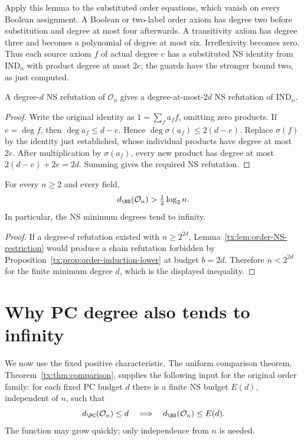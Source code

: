 Apply this lemma to the substituted order equations, which vanish on
every Boolean assignment. A Boolean or two-label order axiom has
degree two before substitution and degree at most four afterwards.
A transitivity axiom has degree three and becomes a polynomial of
degree at most six. Irreflexivity becomes zero. Thus each source
axiom $f$ of actual degree $e$ has a substituted NS identity from
$\mathrm{IND}_n$ with product degree at most $2e$; the guards have
the stronger bound two, as just computed.

\begin{lemma}
\label{tx:lem:order-NS-restriction}
A degree-$d$ NS refutation of $\mathcal O_n$ gives a degree-at-most-$2d$
NS refutation of $\mathrm{IND}_n$.
\end{lemma}
\begin{proof}
Write the original identity as $1=\sum_f a_ff$, omitting zero
products. If $e=\deg f$, then $\deg a_f\le d-e$. Hence
$\deg\sigma(a_f)\le2(d-e)$. Replace $\sigma(f)$ by the identity
just established, whose individual products have degree at most $2e$.
After multiplication by $\sigma(a_f)$, every new product has degree
at most $2(d-e)+2e=2d$. Summing gives the required NS refutation.
\end{proof}

\begin{corollary}
\label{tx:cor:order-NS-seed}
For every $n\ge2$ and every field,
\begin{equation}\label{tx:eq:order-log-seed}
                        d_{\NS}(\mathcal O_n)>
                                      \tfrac12\log_2 n.
\end{equation}
In particular, the NS minimum degrees tend to infinity.
\end{corollary}
\begin{proof}
If a degree-$d$ refutation existed with $n\ge2^{2d}$,
Lemma~\ref{tx:lem:order-NS-restriction} would produce a chain refutation
forbidden by Proposition~\ref{tx:prop:order-induction-lower} at budget
$b=2d$. Therefore $n<2^{2d}$ for the finite minimum degree $d$,
which is the displayed inequality.
\end{proof}

\section{Why PC degree also tends to infinity}
We now use the fixed positive characteristic. The uniform comparison
theorem, Theorem~\ref{tx:thm:comparison}, supplies the
following input for the original order family: for each fixed PC
budget $d$ there is a finite NS budget $E(d)$, independent of $n$,
such that
\begin{equation}\label{tx:eq:order-comparison-input}
 d_{\PC}(\mathcal O_n)\le d
               \quad\Longrightarrow\quad
 d_{\NS}(\mathcal O_n)\le E(d).
\end{equation}
The function may grow quickly; only independence from $n$ is needed.

